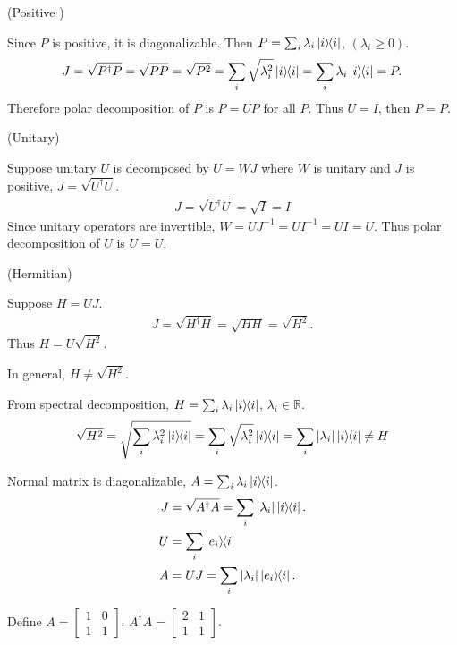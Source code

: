 
(Positive )

 Since $P$ is positive, it is diagonalizable. Then $P = \sum_i \lambda_i \ket{i}\hspace{-1mm} \bra{i}$, $(\lambda_i \geq 0)$.
\begin{align*}
	J = \sqrt{P^\dagger P} = \sqrt{P P} = \sqrt{P^2} = \sum_i \sqrt{\lambda_i^2} \ket{i}\hspace{-1mm} \bra{i} = \sum_i \lambda_i \ket{i}\hspace{-1mm} \bra{i} = P.
\end{align*}
 Therefore polar decomposition of $P$ is $P = UP$ for all $P$.
 Thus $U = I$, then $P = P$.


\vspace{5mm}
(Unitary)

Suppose unitary $U$ is decomposed by $U = WJ$ where $W$ is unitary and $J$ is positive, $J = \sqrt{U^\dagger U}$.
\begin{align*}
	J = \sqrt{U^\dagger U} = \sqrt{I} = I
\end{align*}
Since unitary operators are invertible, $W = UJ^{-1} = UI^{-1} = UI = U$.
Thus polar decomposition of $U$ is $U = U$.


\vspace{5mm}
(Hermitian)

Suppose $H = UJ$.
\begin{align*}
	J = \sqrt{H^\dagger H} = \sqrt{HH} = \sqrt{H^2}.
\end{align*}
Thus $H = U\sqrt{H^2}$.

\begin{screen}
	In general, $H \neq \sqrt{H^2}$.

	From spectral decomposition, $H = \sum_i \lambda_i \ket{i}\hspace{-1mm} \bra{i}$, $\lambda_i \in \mathds{R}$.
	\begin{align*}
		 \sqrt{H^2} = \sqrt{ \sum_i \lambda_i^2 \ket{i}\hspace{-1mm} \bra{i} }
		 =
 		\sum_i
 			\sqrt{
 				\lambda_i^2
			} \ket{i}\hspace{-1mm} \bra{i}
		= \sum_i | \lambda_i | \ket{i}\hspace{-1mm} \bra{i} \neq H
	\end{align*}
\end{screen}



Normal matrix is diagonalizable, $A = \sum_i \lambda_i \ket{i}\hspace{-1mm} \bra{i}$.
\begin{align*}
	J &= \sqrt{A^\dagger A} = \sum_i | \lambda_i | \ket{i}\hspace{-1mm} \bra{i}.\\
	U &= \sum_i \ket{e_i}\hspace{-1mm} \bra{i}\\
	A &= UJ = \sum_i |\lambda_i| \ket{e_i}\hspace{-1mm} \bra{i}.
\end{align*}




Define
$A = \begin{bmatrix}
1 & 0 \\
1 & 1
\end{bmatrix}$.
%
$A^\dagger A = \begin{bmatrix}
2 & 1 \\
1 & 1
\end{bmatrix}$.

